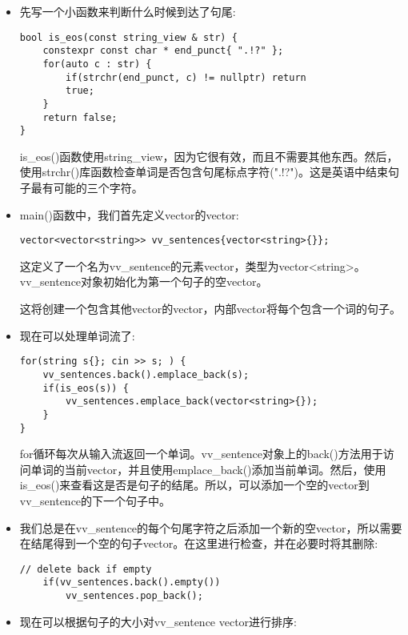 \begin{itemize}
\item 
先写一个小函数来判断什么时候到达了句尾:

\begin{lstlisting}[style=styleCXX]
bool is_eos(const string_view & str) {
	constexpr const char * end_punct{ ".!?" };
	for(auto c : str) {
		if(strchr(end_punct, c) != nullptr) return
		true;
	}
	return false;
}
\end{lstlisting}

is\_eos()函数使用string\_view，因为它很有效，而且不需要其他东西。然后，使用strchr()库函数检查单词是否包含句尾标点字符(".!?")。这是英语中结束句子最有可能的三个字符。

\item 
main()函数中，我们首先定义vector的vector:

\begin{lstlisting}[style=styleCXX]
vector<vector<string>> vv_sentences{vector<string>{}};
\end{lstlisting}

这定义了一个名为vv\_sentence的元素vector，类型为vector<string>。vv\_sentence对象初始化为第一个句子的空vector。

这将创建一个包含其他vector的vector，内部vector将每个包含一个词的句子。

\item 
现在可以处理单词流了:

\begin{lstlisting}[style=styleCXX]
for(string s{}; cin >> s; ) {
	vv_sentences.back().emplace_back(s);
	if(is_eos(s)) {
		vv_sentences.emplace_back(vector<string>{});
	}
}
\end{lstlisting}

for循环每次从输入流返回一个单词。vv\_sentence对象上的back()方法用于访问单词的当前vector，并且使用emplace\_back()添加当前单词。然后，使用is\_eos()来查看这是否是句子的结尾。所以，可以添加一个空的vector到vv\_sentence的下一个句子中。

\item 
我们总是在vv\_sentence的每个句尾字符之后添加一个新的空vector，所以需要在结尾得到一个空的句子vector。在这里进行检查，并在必要时将其删除:

\begin{lstlisting}[style=styleCXX]
	// delete back if empty
	if(vv_sentences.back().empty())
		vv_sentences.pop_back();
\end{lstlisting}

\item 
现在可以根据句子的大小对vv\_sentence vector进行排序:


\end{itemize}
